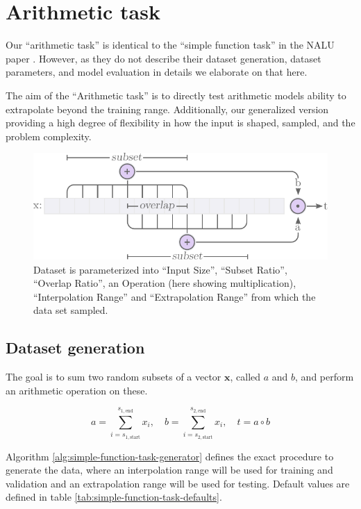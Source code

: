 \section{Arithmetic task}

Our ``arithmetic task'' is identical to the ``simple function task'' in the NALU paper \cite{trask-nalu}. However, as they do not describe their dataset generation, dataset parameters, and model evaluation in details we elaborate on that here.

The aim of the ``Arithmetic task'' is to directly test arithmetic models ability to extrapolate beyond the training range. Additionally, our generalized version providing a high degree of flexibility in how the input is shaped, sampled, and the problem complexity.

\begin{figure}[h]
\centering
\includegraphics[scale=0.8]{graphics/function_task_static_problem.pdf}
\caption{Dataset is parameterized into ``Input Size'', ``Subset Ratio'', ``Overlap Ratio'', an Operation (here showing multiplication), ``Interpolation Range'' and ``Extrapolation Range'' from which the data set sampled.}
\label{fig:simple-function-task-problem}
\end{figure}

\subsection{Dataset generation}
\label{sec:appendix:simple-function-task:data-generation}

The goal is to sum two random subsets of a vector $\mathbf{x}$, called $a$ and $b$, and perform an arithmetic operation on these.

\begin{equation}
    a = \sum_{i=s_{1,\mathrm{start}}}^{s_{1,\mathrm{end}}} x_i, \quad b = \sum_{i=s_{2,\mathrm{start}}}^{s_{2,\mathrm{end}}} x_i, \quad t = a \circ b
\end{equation}

Algorithm \ref{alg:simple-function-task-generator} defines the exact procedure to generate the data, where an interpolation range will be used for training and validation and an extrapolation range will be used for testing. Default values are defined in table \ref{tab:simple-function-task-defaults}.

